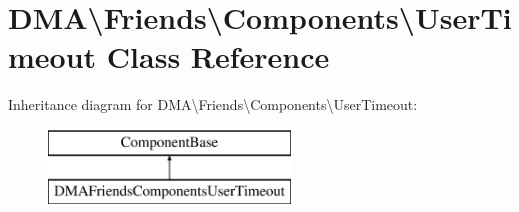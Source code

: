 \hypertarget{classDMA_1_1Friends_1_1Components_1_1UserTimeout}{\section{D\+M\+A\textbackslash{}Friends\textbackslash{}Components\textbackslash{}User\+Timeout Class Reference}
\label{classDMA_1_1Friends_1_1Components_1_1UserTimeout}
}
Inheritance diagram for D\+M\+A\textbackslash{}Friends\textbackslash{}Components\textbackslash{}User\+Timeout\+:\begin{figure}[H]
\begin{center}
\leavevmode
\includegraphics[height=2.000000cm]{d7/d5c/classDMA_1_1Friends_1_1Components_1_1UserTimeout}
\end{center}
\end{figure}
